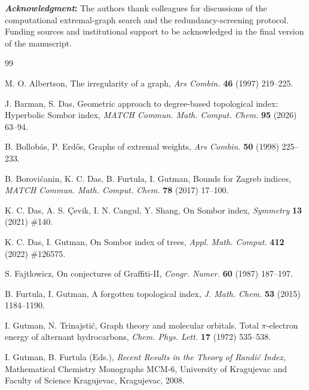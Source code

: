 \documentclass[a5paper, 10pt]{article}
\theoremstyle{plain}
\theoremstyle{remark}
\theoremstyle{definition}
\newcommand{\acknowledgment}[1]{\vspace{5mm}\singlespacing
    {\noindent\textbf{\textit{Acknowledgment\/}:} #1}
}
\begin{document}
\acknowledgment{The authors thank colleagues for discussions of
the computational extremal-graph search and the
redundancy-screening protocol. Funding sources and institutional
support to be acknowledged in the final version of the
manuscript.}

\singlespacing
\begin{thebibliography}{99}

 M. O. Albertson, The irregularity of a
    graph, \textit{Ars Combin.\/} \textbf{46} (1997) 219--225.

 J. Barman, S. Das, Geometric approach
    to degree-based topological index: Hyperbolic Sombor index,
    \textit{MATCH Commun. Math. Comput. Chem.\/}
    \textbf{95} (2026) 63--94.

 B. Bollob\'as, P. Erd\H{o}s,
    Graphs of extremal weights,
    \textit{Ars Combin.\/} \textbf{50} (1998) 225--233.

 B. Borovi\'canin,
    K. C. Das, B. Furtula, I. Gutman, Bounds for Zagreb indices,
    \textit{MATCH Commun. Math. Comput. Chem.\/}
    \textbf{78} (2017) 17--100.

 K. C. Das, A. S. \c{C}evik,
    I. N. Cangul, Y. Shang, On Sombor index,
    \textit{Symmetry\/} \textbf{13} (2021) \#140.

 K. C. Das, I. Gutman,
    On Sombor index of trees,
    \textit{Appl. Math. Comput.\/}
    \textbf{412} (2022) \#126575.

 S. Fajtlowicz, On conjectures of
    Graffiti-II, \textit{Congr. Numer.\/} \textbf{60} (1987) 187--197.

 B. Furtula, I. Gutman, A forgotten
    topological index, \textit{J. Math. Chem.\/}
    \textbf{53} (2015) 1184--1190.

 I. Gutman, N. Trinajsti\'c, Graph theory and
    molecular orbitals. Total $\pi$-electron energy of alternant
    hydrocarbons, \textit{Chem. Phys. Lett.\/}
    \textbf{17} (1972) 535--538.

 I. Gutman, B. Furtula (Eds.),
    \textit{Recent Results in the Theory of Randi\'c Index\/},
    Mathematical Chemistry Monographs MCM-6, University of
    Kragujevac and Faculty of Science Kragujevac, Kragujevac, 2008.


\end{thebibliography}
\end{document}
